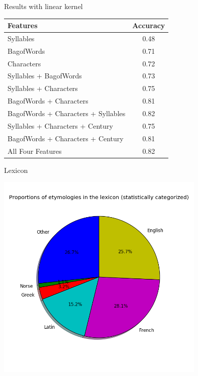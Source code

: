 \documentclass[10pt]{beamer}
\begin{document}
\begin{frame}[fragile]{Results with linear kernel}
  
\centering
\begin{tabular}{l c}
  \hline
  Features & Accuracy \\
  \hline
  Syllables & 0.48 \\
  BagofWords & 0.71 \\
  Characters & 0.72 \\
  Syllables + BagofWords & 0.73 \\
  Syllables + Characters & 0.75 \\
  BagofWords + Characters & 0.81 \\
  BagofWords + Characters + Syllables & 0.82 \\
  Syllables + Characters + Century & 0.75 \\
  BagofWords + Characters + Century & 0.81 \\
  All Four Features & 0.82 \\

  \hline
\end{tabular}

\end{frame}






  





  


\begin{frame}[fragile]{Lexicon}

  \pause
  \centerline{\includegraphics[width=10cm]{statcategorizedlexiconpie.png}}

  
\end{frame}
\end{document}
